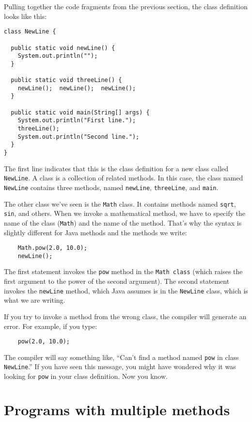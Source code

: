 \documentclass[12pt]{book}
\theoremstyle{definition}
\begin{document}
Pulling together the code fragments from the previous
section, the class definition looks like this:

\begin{lstlisting}
class NewLine {

  public static void newLine() {
    System.out.println("");
  }

  public static void threeLine() {
    newLine();  newLine();  newLine();
  }

  public static void main(String[] args) {
    System.out.println("First line.");
    threeLine();
    System.out.println("Second line.");
  }
}
\end{lstlisting}
%
The first line indicates that this is the class definition for a new
class called {\tt NewLine}.  A class is a collection of related
methods.  In this case, the class named {\tt NewLine} contains three
methods, named {\tt newLine}, {\tt threeLine}, and {\tt main}.

The other class we've seen is the {\tt Math} class.  It contains
methods named {\tt sqrt}, {\tt sin}, and others.  When
we invoke a mathematical method, we have to specify
the name of the class ({\tt Math}) and the name of the method.
That's why the syntax is slightly different for Java
methods and the methods we write:

\begin{lstlisting}
    Math.pow(2.0, 10.0);
    newLine();
\end{lstlisting}
%
The first statement invokes the {\tt pow} method in
the {\tt Math class} (which raises the first argument to the
power of the second argument).  The second statement invokes
the {\tt newLine} method, which Java assumes 
is in the {\tt NewLine} class, which is what we are writing.

If you try to invoke a method from the wrong class, the
compiler will generate an error.  For example, if you
type:

\begin{lstlisting}
    pow(2.0, 10.0);
\end{lstlisting}
%
The compiler will say something like, ``Can't find a method
named {\tt pow} in class {\tt NewLine}.''  If you have
seen this message, you might have wondered why it was looking
for {\tt pow} in your class definition.  Now you know.


\section {Programs with multiple methods}
\end{document}
